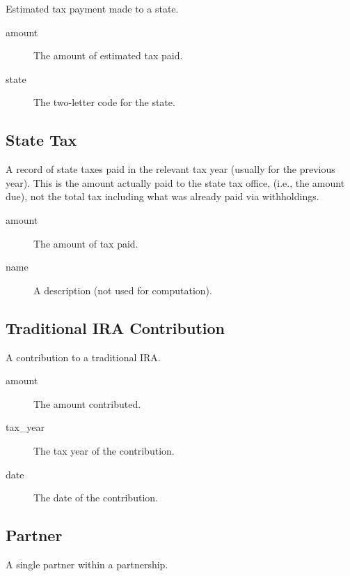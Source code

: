 Estimated tax payment made to a state.

\begin{description}
\item[amount] The amount of estimated tax paid.
\item[state] The two-letter code for the state.
\end{description}




\subsection{State Tax}

A record of state taxes paid in the relevant tax year (usually for the previous
year). This is the amount actually paid to the state tax office, (i.e., the
amount due), not the total tax including what was already paid via withholdings.

\begin{description}
\item[amount] The amount of tax paid.
\item[name] A description (not used for computation).
\end{description}

\subsection{Traditional IRA Contribution}

A contribution to a traditional IRA.

\begin{description}
\item[amount] The amount contributed.
\item[tax\_year] The tax year of the contribution.
\item[date] The date of the contribution.
\end{description}


\subsection{Partner}

A single partner within a partnership.

